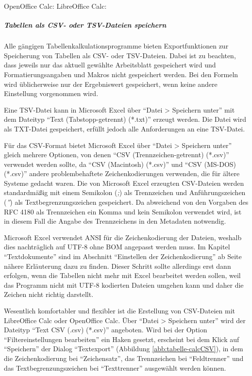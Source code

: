\begin{flushleft}
	OpenOffice Calc: 
	LibreOffice Calc: 
\end{flushleft}


\subparagraph{Tabellen als CSV- oder TSV-Dateien speichern}
Alle gängigen Tabellenkalkulationsprogramme bieten Exportfunktionen zur Speicherung von Tabellen als CSV- oder TSV-Dateien. Dabei ist zu beachten, dass jeweils nur das aktuell gewählte Arbeitsblatt gespeichert wird und Formatierungsangaben und Makros nicht gespeichert werden. Bei den Formeln wird üblicherweise nur der Ergebniswert gespeichert, wenn keine andere Einstellung vorgenommen wird.

Eine TSV-Datei kann in Microsoft Excel über "`Datei > Speichern unter"' mit dem Dateityp "`Text (Tabstopp-getrennt) (*.txt)"' erzeugt werden. Die Datei wird als TXT-Datei gespeichert, erfüllt jedoch alle Anforderungen an eine TSV-Datei. 

Für das CSV-Format bietet Microsoft Excel über "`Datei > Speichern unter"' gleich mehrere Optionen, von denen "`CSV (Trennzeichen-getrennt) (*.csv)"' verwendet werden sollte, da "`CSV (Macintosh) (*.csv)"' und "`CSV (MS-DOS) (*.csv)"' andere problembehaftete Zeichenkodierungen verwenden, die für ältere Systeme gedacht waren. Die von Microsoft Excel erzeugten CSV-Dateien werden standardmäßig mit einem Semikolon (\emph{;}) als Trennzeichen und Anführungszeichen (\emph{''}) als Textbegrenzungszeichen gespeichert. Da abweichend von den Vorgaben des RFC 4180 als Trennzeichen ein Komma und kein Semikolon verwendet wird, ist in diesem Fall die Angabe des Trennzeichens in den Metadaten notwendig.

Microsoft Excel verwendet ANSI für die Zeichenkodierung der Dateien, weshalb dies nachträglich auf UTF-8 ohne BOM angepasst werden muss. Im Kapitel "`Textdokumente"' sind im Abschnitt "`Einstellen der Zeichenkodierung"' ab Seite \pageref{text-encodingEinstellen} nähere Erläuterung dazu zu finden. Dieser Schritt sollte allerdings erst dann erfolgen, wenn die Tabellen nicht mehr mit Excel bearbeitet werden sollen, weil das Programm nicht mit UTF-8 kodierten Dateien umgehen kann und daher die Zeichen nicht richtig darstellt.

Wesentlich komfortabler und flexibler ist die Erstellung von CSV-Dateien mit LibreOffice Calc oder OpenOffice Calc. Über "`Datei > Speichern unter"' wird der Dateityp "`Text CSV (.csv) (*.csv)"' angeboten. Wird bei der Option "`Filtereinstellungen bearbeiten"' ein Haken gesetzt, erscheint bei dem Klick auf "`Speichern"' der Dialog "`Textexport"' (Abbildung \ref{abb:tabelle-calcCSV}), in dem die Zeichenkodierung bei "`Zeichensatz"', das Trennzeichen bei "`Feldtrenner"' und das Textbegrenzungszeichen bei "`Texttrenner"' ausgewählt werden können. 

